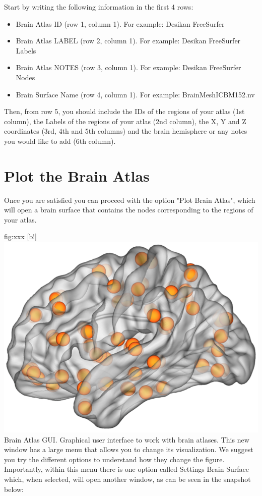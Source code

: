\documentclass{tufte-handout}
\begin{document}
Start by writing the following information in the first 4 rows:
\begin{itemize}

\item Brain Atlas ID (row 1, column 1). 
For example: Desikan FreeSurfer

\item Brain Atlas LABEL (row 2, column 1). 
For example: Desikan FreeSurfer Labels

\item Brain Atlas NOTES (row 3, column 1).
For example: Desikan FreeSurfer Nodes

\item Brain Surface Name (row 4, column 1).
For example: BrainMeshICBM152.nv

\end{itemize}
Then, from row 5, you should include the IDs of the regions of your atlas (1st column), the Labels of the regions of your atlas (2nd column), the X, Y and Z coordinates (3rd, 4th and 5th columns) and the brain hemisphere or any notes you would like to add (6th column).	

\clearpage
\section{Plot the Brain Atlas}

Once you are satisfied you can proceed with the option "Plot Brain Atlas", which will open a brain surface that contains the nodes corresponding to the regions of your atlas.

	{fig:xxx}
	{
	[b!]
	\includegraphics{tut_ba/fig2.png}
	}
	{Brain Atlas GUI.}
	{
	Graphical user interface to work with brain atlases. 
	}
This new window has a large menu that allows you to change its visualization. We suggest you try the different options to understand how they change the figure. Importantly, within this menu there is one option called Settings Brain Surface which, when selected, will open another window, as can be seen in the snapshot below:
\end{document}
